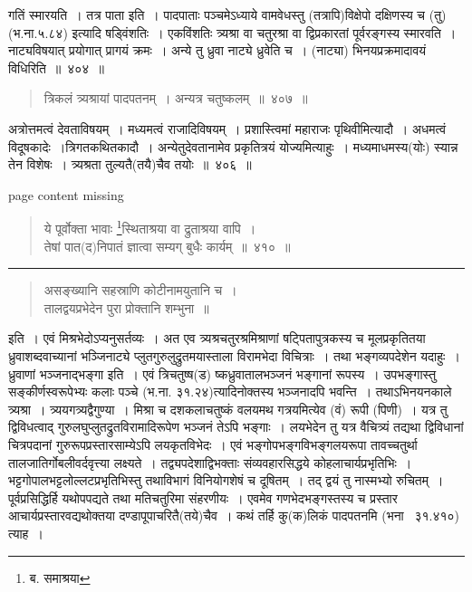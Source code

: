 \documentclass[11pt, openany]{book}
\begin{document}
गतिं स्मारयति~। तत्र पाता इति~। पादपाताः {\qtt पञ्चमेऽध्याये वामवेधस्तु (तत्रापि)विक्षेपो दक्षिणस्य} च (तु)(भ.ना.५.८४) इत्यादि षड्विंशतिः~। एकविंशतिः त्र्यश्रा वा चतुरश्रा वा द्विप्रकारतां पूर्वरङ्गस्य स्मारवति~। नाट्यविषयात् प्रयोगात् प्रागयं क्रमः~। अन्ये तु ध्रुवा नाट्ये ध्रुवेति च~। (नाट्या) भिनयप्रक्रमादावयं विधिरिति~॥~४०४~॥

\begin{quote}
{\qt त्रिकलं त्र्यश्रायां पादपतनम्~। अन्यत्र चतुष्कलम्~॥~४०७~॥}
\end{quote}

{\qtt अत्रोत्तमत्वं} देवताविषयम्~। मध्यमत्वं राजादिविषयम्~। प्रशास्त्विमां महाराजः पृथिवीमित्यादौ~। अधमत्वं विदूषकादेः~।त्रिगतकथितकादौ~। अन्येतुदेवतानामेव प्रकृतित्रयं योज्यमित्याहुः~। मध्यमाधमस्य(योः) स्यान्न तेन विशेषः~। त्र्यश्रता तुल्यतै(तयै)चैव तयोः~॥~४०६~॥

\newpage
page content missing

\newpage

\begin{quote}
{\na ये पूर्वोक्ता भावाः \renewcommand{\thefootnote}{1}\footnote{ब. समाश्रया}स्थिताश्रया वा द्रुताश्रया वापि~।\\
 तेषां पात(द)निपातं ज्ञात्वा सम्यग् बुधैः कार्यम्~॥~४१०~॥}
\end{quote}

\hrule

\begin{quote}
{\qt असङ्ख्यानि सहस्राणि कोटीनामयुतानि च~।\\
 तालद्वयप्रभेदेन पुरा प्रोक्तानि शम्भुना~॥}
\end{quote}

\noindent
इति~। एवं मिश्रभेदोऽप्यनुसर्तव्यः~। अत एव त्र्यश्रचतुरश्रमिश्राणां षट्पितापुत्रकस्य च मूलप्रकृतितया ध्रुवाशब्दवाच्यानां भञ्जिनाट्ये प्लुतगुरुलुद्रुतमयास्ताला विरामभेदा विचित्राः~। तथा भङ्गव्यपदेशेन यदाहुः~। {\qtt ध्रुवाणां भञ्जनाद्भङ्गा} इति~। एवं त्रिचतुष्ष(ड) ष्कध्रुवातालभञ्जनं भङ्गानां रूपस्य~। उपभङ्गास्तु सङ्कीर्णस्वरूपेभ्यः कलाः पञ्चे (भ.ना. ३१.२४)त्यादिनोक्तस्य भञ्जनादपि भवन्ति~। तथाऽभिनयनकाले त्र्यश्रा~। त्र्ययगत्र्यद्वैगुण्या~। मिश्रा च दशकलाचतुष्कं वलयमथ गत्रयमित्येव (वं) रूपी (पिणी)~। यत्र तु द्विविधत्वाद् गुरुलघुप्लुतद्रुतविरामादिरूपेण भञ्जनं तेऽपि भङ्गाः~। लयभेदेन तु यत्र वैचित्र्यं तद्यथा द्विविधानां चित्रपदानां गुरुरूपप्रस्तारसाम्येऽपि लयकृतविभेदः~। एवं भङ्गोपभङ्गविभङ्गलयरूपा तावच्चतुर्था तालजातिर्गोबलीवर्दवृत्त्या लक्ष्यते~। तद्व्यपदेशाद्विभक्ताः संव्यवहारसिद्धये कोहलाचार्यप्रभृतिभिः~। भट्टगोपालभट्टलोल्लटप्रभृतिभिस्तु तथाविभागं विनियोगशेषं च दूषितम्~। तद् द्वयं तु नास्मभ्यो रुचितम्~। पूर्वप्रसिद्धिर्हि यथोपपद्यते तथा मतिचतुरिमा संहरणीयः~। एवमेव गणभेदभङ्गस्तस्य च प्रस्तार आचार्यप्रस्तारवद्यथोक्तया दण्डापूपाचरितै(तये)चैव~। कथं तर्हि कु(क)लिकं पादपतनमि (भना \textendash\ ३१.४१०) त्याह~।
\end{document}
